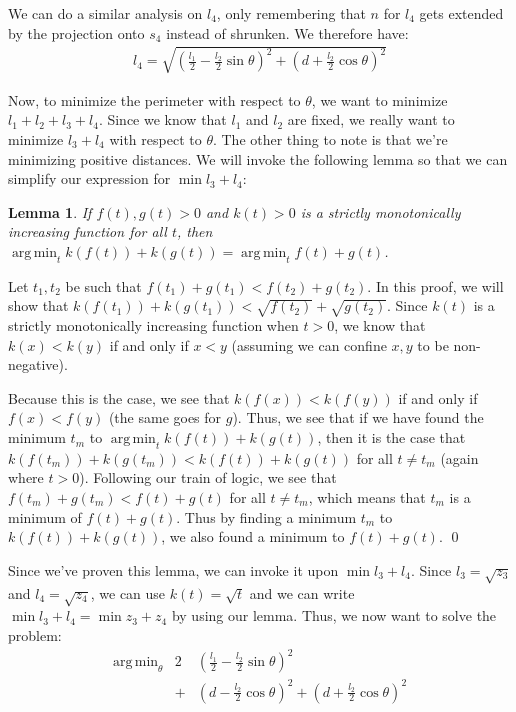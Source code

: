 \documentclass[12pt]{amsart}   %
\newtheorem{lemma}[theorem]{Lemma}
\DeclareMathOperator*{\argmin}{arg\,min}
\begin{document}
We can do a similar analysis on $l_4$, only remembering that $n$ for $l_4$ gets extended by the projection onto $s_4$ instead of shrunken. We therefore have:
\begin{eqnarray}
  l_4 = \sqrt{ \left(\frac{l_1}{2} - \frac{l_2}{2} \sin \theta \right)^2 + \left( d + \frac{l_2}{2} \cos \theta \right)^2 }
\end{eqnarray}

Now, to minimize the perimeter with respect to $\theta$, we want to minimize $l_1 + l_2 + l_3 + l_4$. Since we know that $l_1$ and $l_2$ are fixed, we really want to minimize $l_3 + l_4$ with respect to $\theta$. The other thing to note is that we're minimizing positive distances. We will invoke the following lemma so that we can simplify our expression for $\min l_3 + l_4$:

\begin{lemma}
  If $f(t), g(t) > 0$ and $k(t) > 0$ is a strictly monotonically increasing function for all $t$, then $\argmin_t k(f(t)) + k(g(t)) = \argmin_t f(t) + g(t)$.
  \label{lemma:minsqrt}
\end{lemma}
\proof Let $t_1, t_2$ be such that $f(t_1) + g(t_1) < f(t_2) + g(t_2)$. In this proof, we will show that $k(f(t_1)) + k(g(t_1)) < \sqrt{f(t_2)} + \sqrt{g(t_2)}$. Since $k(t)$ is a strictly monotonically increasing function when $t > 0$, we know that $k(x) < k(y)$ if and only if $x < y$ (assuming we can confine $x, y$ to be non-negative).

Because this is the case, we see that $k(f(x)) < k(f(y))$ if and only if $f(x) < f(y)$ (the same goes for $g$). Thus, we see that if we have found the minimum $t_m$ to $\argmin_t k(f(t)) + k(g(t))$, then it is the case that $k(f(t_m)) + k(g(t_m)) < k(f(t)) + k(g(t))$ for all $t \neq t_m$ (again where $t > 0$). Following our train of logic, we see that $f(t_m) + g(t_m) < f(t) + g(t)$ for all $t \neq t_m$, which means that $t_m$ is a minimum of $f(t) + g(t)$. Thus by finding a minimum $t_m$ to $k(f(t)) + k(g(t))$, we also found a minimum to $f(t) + g(t)$. \qed

Since we've proven this lemma, we can invoke it upon $\min l_3 + l_4$. Since $l_3 = \sqrt{z_3}$ and $l_4 = \sqrt{z_4}$, we can use $k(t) = \sqrt{t}$ and we can write $\min l_3 + l_4 = \min z_3 + z_4$ by using our lemma. Thus, we now want to solve the problem:
\begin{eqnarray}
  \argmin_{\theta} &2& \left(\frac{l_1}{2} - \frac{l_2}{2} \sin \theta \right)^2 \\
  &+& \left( d - \frac{l_2}{2} \cos \theta \right)^2 + \left( d + \frac{l_2}{2} \cos \theta \right)^2
\end{eqnarray}
\end{document}
